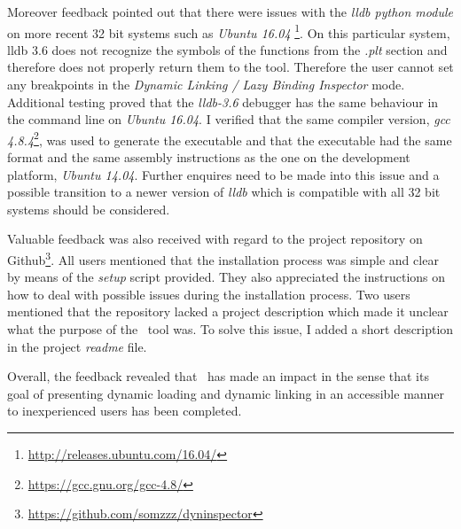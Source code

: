 Moreover feedback pointed out that there were issues with the \textit{lldb python module} on more recent 32 bit systems such as \textit{Ubuntu 16.04} \footnote{\url{http://releases.ubuntu.com/16.04/}}. On this particular system, lldb 3.6 does not recognize the symbols of the functions from the \textit{.plt} section and therefore does not properly return them to the tool. Therefore the user cannot set any breakpoints in the \textit{Dynamic Linking / Lazy Binding Inspector} mode. Additional testing proved that the \textit{lldb-3.6} debugger has the same behaviour in the command line on \textit{Ubuntu 16.04}. I verified that the same compiler version, \textit{gcc 4.8.4}\footnote{\url{https://gcc.gnu.org/gcc-4.8/}}, was used to generate the executable and that the executable had the same format and the same assembly instructions as the one on the development platform, \textit{Ubuntu 14.04}. Further enquires need to be made into this issue and a possible transition to a newer version of \textit{lldb} which is compatible with all 32 bit systems should be considered.

Valuable feedback was also received with regard to the project repository on Github\footnote{\url{https://github.com/somzzz/dyninspector}}. All users mentioned that the installation process was simple and clear by means of the \textit{setup} script provided. They also appreciated the instructions on how to deal with possible issues during the installation process. Two users mentioned that the repository lacked a project description which made it unclear what the purpose of the \project\ tool was. To solve this issue, I added a short description in the project \textit{readme} file.

Overall, the feedback revealed that \project\ has made an impact in the sense that its goal of presenting dynamic loading and dynamic linking in an accessible manner to inexperienced users has been completed.
